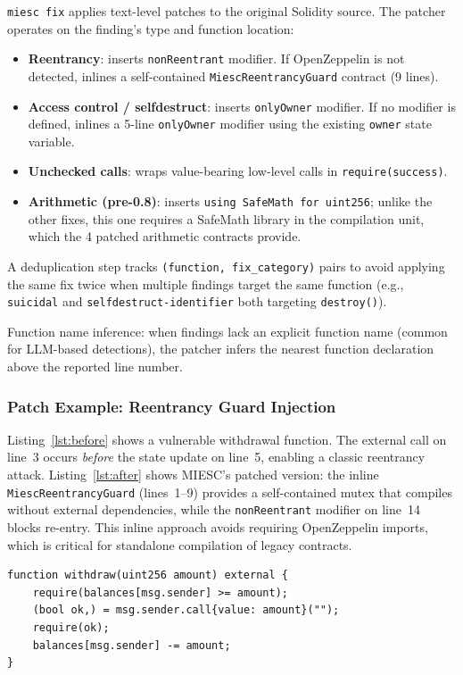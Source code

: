 \documentclass[conference]{IEEEtran}
\begin{document}
\texttt{miesc fix} applies text-level patches to the original Solidity source. The patcher operates on the finding's type and function location:

\begin{itemize}
    \item \textbf{Reentrancy}: inserts \texttt{nonReentrant} modifier. If OpenZeppelin is not detected, inlines a self-contained \texttt{MiescReentrancyGuard} contract (9 lines).
    \item \textbf{Access control / selfdestruct}: inserts \texttt{onlyOwner} modifier. If no modifier is defined, inlines a 5-line \texttt{onlyOwner} modifier using the existing \texttt{owner} state variable.
    \item \textbf{Unchecked calls}: wraps value-bearing low-level calls in \texttt{require(success)}.
    \item \textbf{Arithmetic (pre-0.8)}: inserts \texttt{using SafeMath for uint256}; unlike the other fixes, this one requires a SafeMath library in the compilation unit, which the 4 patched arithmetic contracts provide.
\end{itemize}

A deduplication step tracks \texttt{(function, fix\_category)} pairs to avoid applying the same fix twice when multiple findings target the same function (e.g., \texttt{suicidal} and \texttt{selfdestruct-identifier} both targeting \texttt{destroy()}).

Function name inference: when findings lack an explicit function name (common for LLM-based detections), the patcher infers the nearest function declaration above the reported line number.

\subsubsection{Patch Example: Reentrancy Guard Injection}

Listing~\ref{lst:before} shows a vulnerable withdrawal function. The external call on line~3 occurs \emph{before} the state update on line~5, enabling a classic reentrancy attack. Listing~\ref{lst:after} shows MIESC's patched version: the inline \texttt{MiescReentrancyGuard} (lines~1--9) provides a self-contained mutex that compiles without external dependencies, while the \texttt{nonReentrant} modifier on line~14 blocks re-entry. This inline approach avoids requiring OpenZeppelin imports, which is critical for standalone compilation of legacy contracts.

\begin{lstlisting}[caption={Vulnerable: external call before state update},label={lst:before},float=htbp]
function withdraw(uint256 amount) external {
    require(balances[msg.sender] >= amount);
    (bool ok,) = msg.sender.call{value: amount}("");
    require(ok);
    balances[msg.sender] -= amount;
}
\end{lstlisting}
\end{document}
